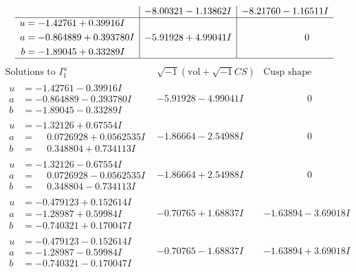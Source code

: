 \documentclass[1p]{elsarticle_modified}
\theoremstyle{definition}
\newcommand{\I}{\sqrt{-1}}
\begin{document}
$$\begin{array}{c|c|c}
 & -8.00321 - 1.13862 I & -8.21760 - 1.16511 I \\ \hline\begin{aligned}
u &= -1.42761 + 0.39916 I \\
a &= -0.864889 + 0.393780 I \\
b &= -1.89045 + 0.33289 I\end{aligned}
 & -5.91928 + 4.99041 I & \phantom{-0.000000 } 0\\
 \hline 
 \end{array}$$\newpage$$\begin{array}{c|c|c}  
\text{Solutions to }I^u_{1}& \I (\text{vol} + \sqrt{-1}CS) & \text{Cusp shape}\\
 \hline 
\begin{aligned}
u &= -1.42761 - 0.39916 I \\
a &= -0.864889 - 0.393780 I \\
b &= -1.89045 - 0.33289 I\end{aligned}
 & -5.91928 - 4.99041 I & \phantom{-0.000000 } 0 \\ \hline\begin{aligned}
u &= -1.32126 + 0.67554 I \\
a &= \phantom{-}0.0726928 + 0.0562535 I \\
b &= \phantom{-}0.348804 + 0.734113 I\end{aligned}
 & -1.86664 - 2.54988 I & \phantom{-0.000000 } 0 \\ \hline\begin{aligned}
u &= -1.32126 - 0.67554 I \\
a &= \phantom{-}0.0726928 - 0.0562535 I \\
b &= \phantom{-}0.348804 - 0.734113 I\end{aligned}
 & -1.86664 + 2.54988 I & \phantom{-0.000000 } 0 \\ \hline\begin{aligned}
u &= -0.479123 + 0.152614 I \\
a &= -1.28987 + 0.59984 I \\
b &= -0.740321 + 0.170047 I\end{aligned}
 & -0.70765 + 1.68837 I & -1.63894 - 3.69018 I \\ \hline\begin{aligned}
u &= -0.479123 - 0.152614 I \\
a &= -1.28987 - 0.59984 I \\
b &= -0.740321 - 0.170047 I\end{aligned}
 & -0.70765 - 1.68837 I & -1.63894 + 3.69018 I \\ \hline\begin{aligned}

\end{aligned}
\end{array}$$
\end{document}

